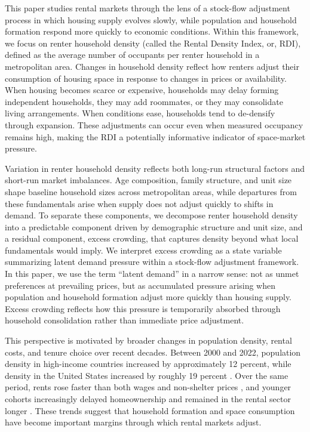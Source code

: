\documentclass[pdflatex,sn-basic]{sn-jnl}%
\theoremstyle{thmstyleone}%
\theoremstyle{thmstyletwo}%
\theoremstyle{thmstylethree}%
\begin{document}
This paper studies rental markets through the lens of a stock-flow adjustment process in which housing supply evolves slowly, while population and household formation respond more quickly to economic conditions. Within this framework, we focus on renter household density (called the Rental Density Index, or, RDI), defined as the average number of occupants per renter household in a metropolitan area. Changes in household density reflect how renters adjust their consumption of housing space in response to changes in prices or availability. When housing becomes scarce or expensive, households may delay forming independent households, they may add roommates, or they may consolidate living arrangements. When conditions ease, households tend to de-densify through expansion. These adjustments can occur even when measured occupancy remains high, making the RDI a potentially informative indicator of space-market pressure.

Variation in renter household density reflects both long-run structural factors and short-run market imbalances. Age composition, family structure, and unit size shape baseline household sizes across metropolitan areas, while departures from these fundamentals arise when supply does not adjust quickly to shifts in demand. To separate these components, we decompose renter household density into a predictable component driven by demographic structure and unit size, and a residual component, excess crowding, that captures density beyond what local fundamentals would imply. We interpret excess crowding as a state variable summarizing latent demand pressure within a stock-flow adjustment framework. In this paper, we use the term “latent demand” in a narrow sense: not as unmet preferences at prevailing prices, but as accumulated pressure arising when population and household formation adjust more quickly than housing supply. Excess crowding reflects how this pressure is temporarily absorbed through household consolidation rather than immediate price adjustment. 

This perspective is motivated by broader changes in population density, rental costs, and tenure choice over recent decades. Between 2000 and 2022, population density in high-income countries increased by approximately 12 percent, while density in the United States increased by roughly 19 percent \cite{worldbankPopDensity}. Over the same period, rents rose faster than both wages and non-shelter prices \cite{feiveson2024rent, stlouisfedConsumerPrice}, and younger cohorts increasingly delayed homeownership and remained in the rental sector longer \cite{fanniemaeConsumersFeeling}. These trends suggest that household formation and space consumption have become important margins through which rental markets adjust.
\end{document}
